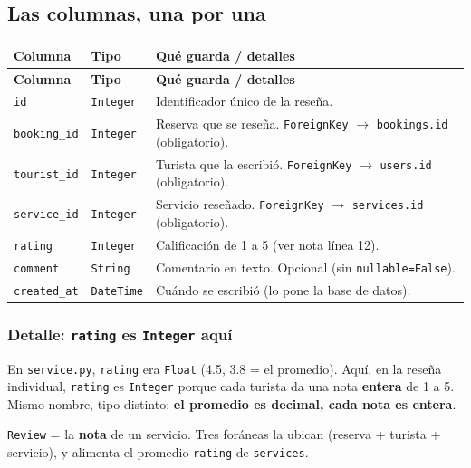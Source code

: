 \documentclass[11pt,a4paper]{article}
\begin{document}
\subsection{Las columnas, una por una}

\begin{center}
{\small
\setlength{\tabcolsep}{4pt}
\begin{longtable}{@{}>{\raggedright\arraybackslash}p{3.4cm}>{\raggedright\arraybackslash}p{3cm}>{\raggedright\arraybackslash}p{8.5cm}@{}}
\toprule
\textbf{Columna} & \textbf{Tipo} & \textbf{Qué guarda / detalles} \\
\midrule
\endfirsthead
\toprule
\textbf{Columna} & \textbf{Tipo} & \textbf{Qué guarda / detalles} \\
\midrule
\endhead
\texttt{id} & \texttt{Integer} & Identificador único de la reseña. \\
\texttt{booking\_id} & \texttt{Integer} & Reserva que se reseña. \texttt{ForeignKey} $\rightarrow$ \texttt{bookings.id} (obligatorio). \\
\texttt{tourist\_id} & \texttt{Integer} & Turista que la escribió. \texttt{ForeignKey} $\rightarrow$ \texttt{users.id} (obligatorio). \\
\texttt{service\_id} & \texttt{Integer} & Servicio reseñado. \texttt{ForeignKey} $\rightarrow$ \texttt{services.id} (obligatorio). \\
\texttt{rating} & \texttt{Integer} & Calificación de 1 a 5 (ver nota línea 12). \\
\texttt{comment} & \texttt{String} & Comentario en texto. Opcional (sin \texttt{nullable=False}). \\
\texttt{created\_at} & \texttt{DateTime} & Cuándo se escribió (lo pone la base de datos). \\
\bottomrule
\end{longtable}
}
\end{center}

\subsubsection{Detalle: \texttt{rating} es \texttt{Integer} aquí}

En \texttt{service.py}, \texttt{rating} era \texttt{Float} (4.5, 3.8 = el promedio). Aquí, en la
reseña individual, \texttt{rating} es \texttt{Integer} porque cada turista da una nota \textbf{entera}
de 1 a 5. Mismo nombre, tipo distinto: \textbf{el promedio es decimal, cada nota es entera}.

\begin{recuadro}
\texttt{Review} = la \textbf{nota} de un servicio. Tres foráneas la ubican (reserva + turista +
servicio), y alimenta el promedio \texttt{rating} de \texttt{services}.
\end{recuadro}
\end{document}
